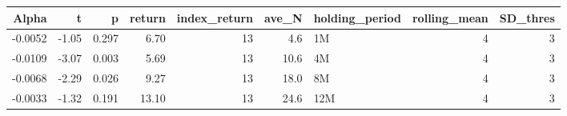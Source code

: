 \begin{table}[ht]
\centering
\begin{tabular}{rrrrrrlrr}
  \hline
Alpha & t & p & return & index\_return & ave\_N & holding\_period & rolling\_mean & SD\_thres \\ 
  \hline
-0.0052 & -1.05 & 0.297 & 6.70 & 13 & 4.6 & 1M &  4 &  3 \\ 
  -0.0109 & -3.07 & 0.003 & 5.69 & 13 & 10.6 & 4M &  4 &  3 \\ 
  -0.0068 & -2.29 & 0.026 & 9.27 & 13 & 18.0 & 8M &  4 &  3 \\ 
  -0.0033 & -1.32 & 0.191 & 13.10 & 13 & 24.6 & 12M &  4 &  3 \\ 
   \hline
\end{tabular}
\end{table}

